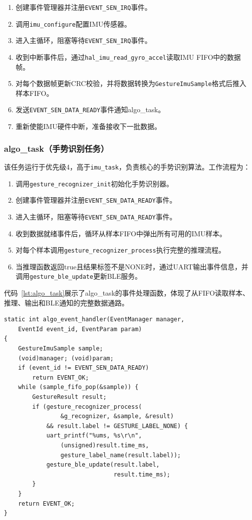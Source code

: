 \documentclass[lettersize,journal]{IEEEtran}
\begin{document}
\begin{enumerate}[leftmargin=*]
    \item 创建事件管理器并注册\texttt{EVENT\_SEN\_IRQ}事件。
    \item 调用\texttt{imu\_configure}配置IMU传感器。
    \item 进入主循环，阻塞等待\texttt{EVENT\_SEN\_IRQ}事件。
    \item 收到中断事件后，通过\texttt{hal\_imu\_read\_gyro\_accel}读取IMU FIFO中的数据帧。
    \item 对每个数据帧更新CRC校验，并将数据转换为\texttt{GestureImuSample}格式后推入样本FIFO。
    \item 发送\texttt{EVENT\_SEN\_DATA\_READY}事件通知algo\_task。
    \item 重新使能IMU硬件中断，准备接收下一批数据。
\end{enumerate}

\subsubsection{algo\_task（手势识别任务）}

该任务运行于优先级4，高于\texttt{imu\_task}，负责核心的手势识别算法。工作流程为：

\begin{enumerate}[leftmargin=*]
    \item 调用\texttt{gesture\_recognizer\_init}初始化手势识别器。
    \item 创建事件管理器并注册\texttt{EVENT\_SEN\_DATA\_READY}事件。
    \item 进入主循环，阻塞等待\texttt{EVENT\_SEN\_DATA\_READY}事件。
    \item 收到数据就绪事件后，循环从样本FIFO中弹出所有可用的IMU样本。
    \item 对每个样本调用\texttt{gesture\_recognizer\_process}执行完整的推理流程。
    \item 当推理函数返回true且结果标签不是NONE时，通过UART输出事件信息，并调用\texttt{gesture\_ble\_update}更新BLE服务。
\end{enumerate}

代码~\ref{lst:algo_task}展示了algo\_task的事件处理函数，体现了从FIFO读取样本、推理、输出和BLE通知的完整数据通路。

\begin{lstlisting}[caption={手势识别任务事件处理（main.c）},label={lst:algo_task}]
static int algo_event_handler(EventManager manager,
    EventId event_id, EventParam param)
{
    GestureImuSample sample;
    (void)manager; (void)param;
    if (event_id != EVENT_SEN_DATA_READY)
        return EVENT_OK;
    while (sample_fifo_pop(&sample)) {
        GestureResult result;
        if (gesture_recognizer_process(
                &g_recognizer, &sample, &result)
            && result.label != GESTURE_LABEL_NONE) {
            uart_printf("%ums, %s\r\n",
                (unsigned)result.time_ms,
                gesture_label_name(result.label));
            gesture_ble_update(result.label,
                               result.time_ms);
        }
    }
    return EVENT_OK;
}
\end{lstlisting}
\end{document}

